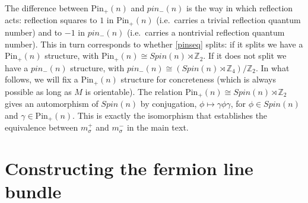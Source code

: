 \documentclass[12pt,a4paper]{article}
\newcommand{\zz}{\mathbb{Z}}
\newcommand{\zt}{\mathbb{Z}_2}
\newcommand\be            {\begin{equation}}
\newcommand\ee            {\end{equation}}
\newcommand{\pin}{\text{Pin}}
\newcommand{\ethan}[1]{{\color{amethyst}\footnotesize{(EL) #1}}}
\begin{document}
The difference between $\pin_+(n)$ and $pin_-(n)$ is the way in which reflection acts: 
reflection squares to $1$ in $\pin_+(n)$ (i.e.\ carries a trivial reflection quantum number) 
and to $-1$ in $pin_-(n)$ (i.e.\ carries a nontrivial reflection quantum number). 
This in turn corresponds to whether \eqref{pinseq} splits: if it splits we have a $\pin_+(n)$ structure, 
with $\pin_+(n) \cong Spin(n) \rtimes \zt$. If it does not split we have a $pin_-(n)$ structure, 
with $pin_-(n) \cong (Spin(n) \rtimes \zz_4)/\zt$. In what follows, we will fix a $\pin_+(n)$ 
structure for concreteness (which is always possible as long as $M$ is orientable). 
The relation $\pin_+(n) \cong Spin(n) \rtimes \zt$ gives an automorphism of $Spin(n)$ by 
conjugation, $\phi \mapsto \gamma \phi \gamma$, for $\phi \in Spin(n)$ and $\gamma \in \pin_+(n)$. 
This is exactly the isomorphism that establishes the equivalence between $m_\sigma^+$ 
and $m_\sigma^-$ in the main text. 



\section{Constructing the fermion line bundle}
\label{fermion_line_bundle} \label{flb_appendix}
\end{document}

